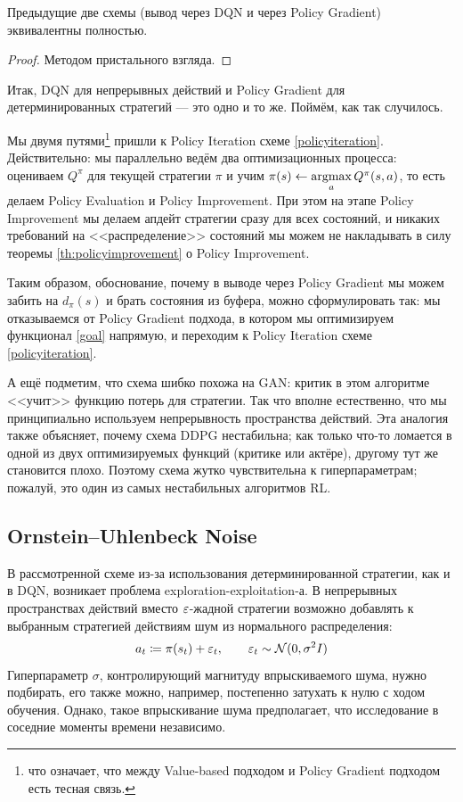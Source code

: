 \begin{theorem}
Предыдущие две схемы (вывод через DQN и через Policy Gradient) эквивалентны полностью.
\begin{proof}
Методом пристального взгляда.
\end{proof}
\end{theorem}

Итак, DQN для непрерывных действий и Policy Gradient для детерминированных стратегий --- это одно и то же. Поймём, как так случилось.

Мы двумя путями\footnote{что означает, что между Value-based подходом и Policy Gradient подходом есть тесная связь.} пришли к Policy Iteration схеме \ref{policyiteration}. Действительно: мы параллельно ведём два оптимизационных процесса: оцениваем $Q^\pi$ для текущей стратегии $\pi$ и учим $\pi(s) \leftarrow \mathop{\mathrm{argmax}}\limits_a Q^\pi(s, a)$, то есть делаем Policy Evaluation и Policy Improvement. При этом на этапе Policy Improvement мы делаем апдейт стратегии сразу для всех состояний, и никаких требований на <<распределение>> состояний мы можем не накладывать в силу теоремы \ref{th:policyimprovement} о Policy Improvement. 

Таким образом, обоснование, почему в выводе через Policy Gradient мы можем забить на $d_\pi(s)$ и брать состояния из буфера, можно сформулировать так: мы отказываемся от Policy Gradient подхода, в котором мы оптимизируем функционал \eqref{goal} напрямую, и переходим к Policy Iteration схеме \ref{policyiteration}.

\begin{remark}
А ещё подметим, что схема шибко похожа на GAN: критик в этом алгоритме <<учит>> функцию потерь для стратегии. Так что вполне естественно, что мы принципиально используем непрерывность пространства действий. Эта аналогия также объясняет, почему схема DDPG нестабильна; как только что-то ломается в одной из двух оптимизируемых функций (критике или актёре), другому тут же становится плохо. Поэтому схема жутко чувствительна к гиперпараметрам; пожалуй, это один из самых нестабильных алгоритмов RL.
\end{remark}

\subsection{Ornstein--Uhlenbeck Noise}

В рассмотренной схеме из-за использования детерминированной стратегии, как и в DQN, возникает проблема exploration-exploitation-а. В непрерывных пространствах действий вместо $\varepsilon$-жадной стратегии возможно добавлять к выбранным стратегией действиям шум из нормального распределения:
$$a_t \coloneqq \pi(s_t) + \varepsilon_t, \qquad \varepsilon_t \sim \mathcal{N}(0, \sigma^2I)$$
Гиперпараметр $\sigma$, контролирующий магнитуду впрыскиваемого шума, нужно подбирать, его также можно, например, постепенно затухать к нулю с ходом обучения. Однако, такое впрыскивание шума предполагает, что исследование в соседние моменты времени независимо.

